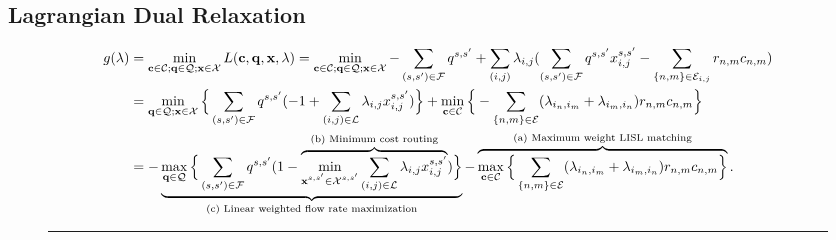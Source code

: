 \documentclass[journal]{IEEEtran}
\begin{document}
\subsection{Lagrangian Dual Relaxation}\label{subsec:lagrangian_dual_relaxation}
\begin{figure}[t]
\begin{align}
      g(\lambda)&= \min_{
        \substack{
          \mathbf{c}\in\mathcal{C};\mathbf{q}\in\mathcal{Q};\mathbf{x}\in\mathcal{X}
        }
      }
      L(\mathbf{c}, \mathbf{q}, \mathbf{x}, \lambda) = \min_{
        \substack{
          \mathbf{c}\in\mathcal{C};\mathbf{q}\in\mathcal{Q};\mathbf{x}\in\mathcal{X}
        }
      } -\sum_{(s,s')\in\mathcal{F} } q^{s,s'} + \sum_{(i,j)}\lambda_{i,j} (\sum_{(s,s')\in \mathcal{F}} q^{s,s'} x^{s,s'}_{i,j} - \sum_{\{n,m\}\in\mathcal{E}_{i,j}} r_{n,m} c_{n,m}) \notag
      \\
      &= \min_{
        \substack{
           \mathbf{q}\in \mathcal{Q};\mathbf{x}\in\mathcal{X}
        }
      }
      \Big\{
      \sum_{(s,s')\in\mathcal{F} } q^{s,s'} (-1 + \sum_{(i,j)\in\mathcal{L}}\lambda_{i,j} x^{s,s'}_{i,j})   
      \Big\} 
      +\min_{
        \substack{
          \mathbf{c}\in\mathcal{C}
        }
      }
      \Big\{
      -\sum_{\{n,m\}\in\mathcal{E}} (\lambda_{i_n,i_m} + \lambda_{i_m,i_n})  r_{n,m} c_{n,m}
      \Big\} \notag
      \\
      &= 
      -\underbrace{\max_{
        \substack{
          \mathbf{q}\in \mathcal{Q}
        }
      }
      \Big\{
      \sum_{(s,s')\in\mathcal{F} } q^{s,s'} (1 - 
      \overbrace{\min_{
        \substack{
          \mathbf{x}^{s,s'}\in\mathcal{X}^{s,s'}
        }
      }
      \sum_{(i,j)\in\mathcal{L}}\lambda_{i,j} x^{s,s'}_{i,j}}^{
      \substack{\text{(b) Minimum cost routing}}
      })
      \Big\}}_{\substack{\text{(c) Linear weighted flow rate maximization}}}
      -
      \overbrace{\max_{
        \substack{
          \mathbf{c}\in\mathcal{C}
        }
      }
      \Big\{
      \sum_{\{n,m\}\in\mathcal{E}} (\lambda_{i_n,i_m} + \lambda_{i_m,i_n})  r_{n,m} c_{n,m}
      \Big\}
      }^{
      \substack{\text{(a) Maximum weight LISL matching}}
      }. \label{eq:prob:constrainted_routing_and_matching:lagrangian_dual}
  \end{align}
  \hrule
\end{figure}
\end{document}
